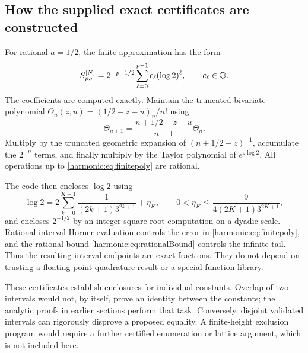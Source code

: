 \subsection{How the supplied exact certificates are constructed}
For rational $a=1/2$, the finite approximation has the form
\begin{equation}\label{harmonic:eq:finitepoly}
 S_{p,r}^{[N]}=2^{-p-1/2}\sum_{\ell=0}^{p-1}c_\ell(\log2)^\ell,
 \qquad c_\ell\in\mathbb{Q}.
\end{equation}
The coefficients are computed exactly. Maintain the truncated bivariate polynomial
$\Theta_n(z,u)=(1/2-z-u)_n/n!$ using
\[
 \Theta_{n+1}=\frac{n+1/2-z-u}{n+1}\Theta_n.
\]
Multiply by the truncated geometric expansion of $(n+1/2-z)^{-1}$, accumulate the $2^{-n}$ terms, and finally multiply by the Taylor polynomial of $e^{z\log2}$. All operations up to \eqref{harmonic:eq:finitepoly} are rational.

The code then encloses $\log2$ using
\[
 \log2=2\sum_{k=0}^{K-1}\frac1{(2k+1)3^{2k+1}}+\eta_K,
 \qquad0<\eta_K\le\frac9{4(2K+1)3^{2K+1}},
\]
and encloses $2^{-1/2}$ by an integer square-root computation on a dyadic scale. Rational interval Horner evaluation controls the error in \eqref{harmonic:eq:finitepoly}, and the rational bound \eqref{harmonic:eq:rationalBound} controls the infinite tail. Thus the resulting interval endpoints are exact fractions. They do not depend on trusting a floating-point quadrature result or a special-function library.

These certificates establish enclosures for individual constants. Overlap of two intervals would not, by itself, prove an identity between the constants; the analytic proofs in earlier sections perform that task. Conversely, disjoint validated intervals can rigorously disprove a proposed equality. A finite-height exclusion program would require a further certified enumeration or lattice argument, which is not included here.


